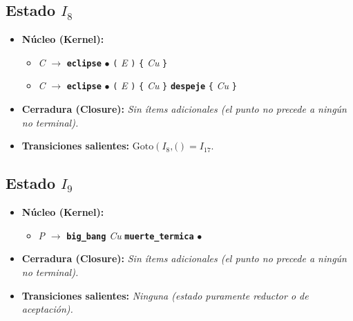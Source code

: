\documentclass[12pt, letterpaper]{article}
\begin{document}
\subsection*{Estado $I_{8}$ }
\begin{itemize}\setlength{\itemsep}{1pt}\setlength{\parskip}{0pt}
\item \textbf{Núcleo (Kernel):}
\begin{itemize}\setlength{\itemsep}{1pt}\setlength{\parskip}{0pt}
    \item \textit{C} $\to$ \textbf{\texttt{eclipse}} $\bullet$ \texttt{(} \textit{E} \texttt{)} \texttt{\{} \textit{Cu} \texttt{\}}
    \item \textit{C} $\to$ \textbf{\texttt{eclipse}} $\bullet$ \texttt{(} \textit{E} \texttt{)} \texttt{\{} \textit{Cu} \texttt{\}} \textbf{\texttt{despeje}} \texttt{\{} \textit{Cu} \texttt{\}}
\end{itemize}
\item \textbf{Cerradura (Closure):} \emph{Sin ítems adicionales (el punto no precede a ningún no terminal).}
\item \textbf{Transiciones salientes:} $\text{Goto}(I_{8}, \texttt{(}) = I_{17}$.
\end{itemize}
\vspace{2pt}
\subsection*{Estado $I_{9}$ }
\begin{itemize}\setlength{\itemsep}{1pt}\setlength{\parskip}{0pt}
\item \textbf{Núcleo (Kernel):}
\begin{itemize}\setlength{\itemsep}{1pt}\setlength{\parskip}{0pt}
    \item \textit{P} $\to$ \textbf{\texttt{big\_bang}} \textit{Cu} \textbf{\texttt{muerte\_termica}} $\bullet$ 
\end{itemize}
\item \textbf{Cerradura (Closure):} \emph{Sin ítems adicionales (el punto no precede a ningún no terminal).}
\item \textbf{Transiciones salientes:} \emph{Ninguna (estado puramente reductor o de aceptación).}
\end{itemize}
\vspace{2pt}
\end{document}
